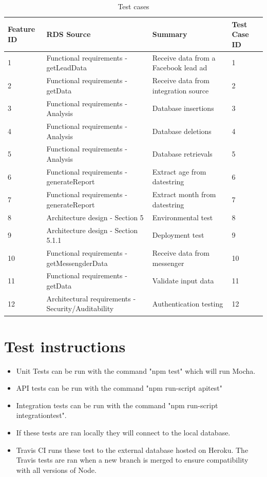 \documentclass{article}
\begin{document}
\begin{table}[H]
\centering
\caption{Test cases}
\label{test_table}
\begin{tabular}{|l|l|l|l|}
\hline
Feature ID & RDS Source                            & Summary                                    & Test Case ID \\ \hline \hline
1          & Functional requirements - getLeadData & Receive data from a Facebook lead ad       & 1            \\ \hline
2          & Functional requirements - getData     & Receive data from integration source & 2            \\ \hline
3          & Functional requirements - Analysis    & Database insertions                        & 3  \\ \hline
4          & Functional requirements - Analysis    & Database deletions                         & 4 \\ \hline
5          & Functional requirements - Analysis    & Database retrievals                        & 5 \\ \hline
6          & Functional requirements - generateReport & Extract age from datestring			    & 6	\\ \hline
7	       & Functional requirements - generateReport & Extract month from datestring			& 7 \\ \hline
8          &  Architecture design - Section 5      & Environmental test                         & 8 \\ \hline
9          &  Architecture design - Section 5.1.1  & Deployment test                            & 9 \\ \hline
10         &  Functional requirements - getMessengderData & Receive data from messenger & 10 \\ \hline
11        &  Functional requirements - getData & Validate input data & 11 \\ \hline
12        &  Architectural requirements - Security/Auditability & Authentication testing & 12 \\ \hline
\end{tabular}
\end{table}


\section{Test instructions} 
\begin{itemize}
\item Unit Tests can be run with the command "npm test" which will run Mocha.
\item API tests can be run with the command "npm run-script apitest"
\item Integration tests can be run with the command "npm run-script integrationtest".  
\item If these tests are ran locally they will connect to the local database.
\item Travis CI runs these test to the external database hosted on Heroku. The Travis tests are ran when a new branch is merged to ensure compatibility with all versions of Node.
\end{itemize}
\cleardoublepage
\end{document}
